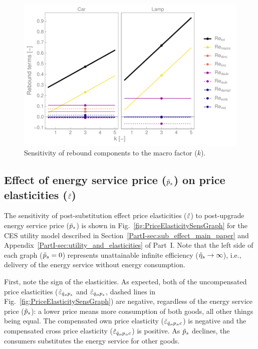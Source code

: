 \documentclass[12pt]{article}\usepackage[]{graphicx}\usepackage[]{xcolor}
\makeatletter
\def\maxwidth{ %
  \ifdim\Gin@nat@width>\linewidth
    \linewidth
  \else
    \Gin@nat@width
  \fi
}
\newenvironment{knitrout}{}{} %
\makeatother
\begin{document}
\begin{knitrout}
\color{fgcolor}\begin{figure}

{\centering \includegraphics[width=\maxwidth]{figure/all_Re_terms_k_graph-1} 

}

\caption[Sensitivity of rebound components to the macro factor ($k$)]{Sensitivity of rebound components to the macro factor ($k$).}\label{fig:all_Re_terms_k_graph}
\end{figure}

\end{knitrout}
  

\subsection{Effect of energy service price ($\tilde{p}_s$) on price elasticities ($\hat{\varepsilon}$)}
\label{sec:price_elasticities_sensitivity}

The sensitivity of post-substitution effect price elasticities ($\hat{\varepsilon}$)
to post-upgrade energy service price ($\tilde{p}_s$)
is shown in Fig.~\ref{fig:PriceElasticitySensGraph}
for the CES utility model described 
in Section~\ref{PartI-sec:sub_effect_main_paper} 
and Appendix~\ref{PartI-sec:utility_and_elasticities}
of Part~I.
Note that the left side of each graph ($\tilde{p}_{s} = 0$)
represents unattainable infinite efficiency ($\tilde{\eta}_s \rightarrow \infty$), 
i.e., delivery of the energy service without energy consumption.

First, note the sign of the elasticities. As expected, both of the
uncompensated price elasticities ($\hat{\varepsilon}_{\dot{q}_s\!,p_s}$ and $\hat{\varepsilon}_{\dot{q}_o\!,p_s}$,
dashed lines in Fig.~\ref{fig:PriceElasticitySensGraph}) 
are negative, regardless of the energy service price ($\tilde{p}_s$):
a lower price means more consumption of both
goods, all other things being equal.
The compensated own price elasticity ($\hat{\varepsilon}_{\dot{q}_s\!,p_s\!,c}$) is negative
and the compensated cross price elasticity ($\hat{\varepsilon}_{\dot{q}_o\!,p_s\!,c}$) is positive.
As $\tilde{p}_s$ declines, the consumers substitutes the energy
service for other goods.
\end{document}
